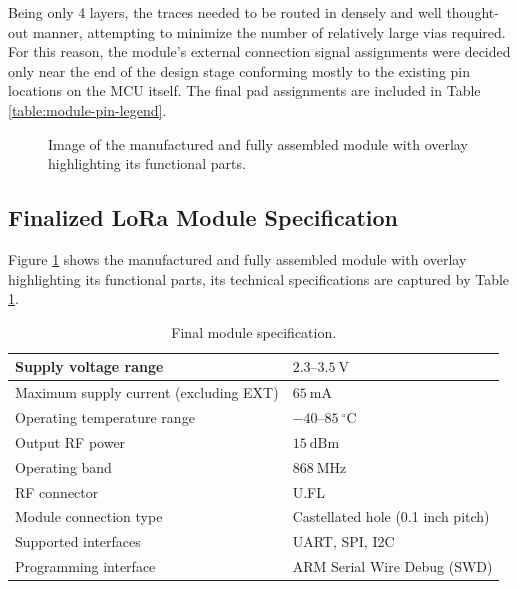 Being only 4 layers, the traces needed to be routed in densely and well thought-out manner, attempting to minimize the number of relatively large vias required. For this reason, the module's external connection signal assignments were decided only near the end of the design stage conforming mostly to the existing pin locations on the MCU itself. The final pad assignments are included in Table \ref{table:module-pin-legend}.

\begin{figure}
    
    \caption{\label{fig:module-v0.1}Image of the manufactured and fully assembled module with overlay highlighting its functional parts.}
\end{figure}

\subsection{Finalized LoRa Module Specification}
Figure \ref{fig:module-v0.1} shows the manufactured and fully assembled module with overlay highlighting its functional parts, its technical specifications are captured by Table \ref{table:module-specification}.

\begin{table}[p]
\begin{center}
\caption{\label{table:module-specification}Final module specification.}
    \begin{tabular}{|l|l|} \hline
    Supply voltage range                    & $2.3\text{--}3.5~\mathrm{V}$\\ \hline
    Maximum supply current (excluding EXT)  & $65~\mathrm{mA}$\\ \hline
    Operating temperature range             & $-40\text{--}85~\mathrm{^\circ C}$\\ \hline
    Output RF power                         & $15~\mathrm{dBm}$\\ \hline
    Operating band                          & $868~\mathrm{MHz}$\\ \hline
    RF connector                            & U.FL \\ \hline
    Module connection type                  & Castellated hole (0.1 inch pitch) \\ \hline
    Supported interfaces                    & UART, SPI, I2C \\ \hline
    Programming interface                   & ARM Serial Wire Debug (SWD) \\ \hline
    \end{tabular}
\end{center}
\end{table}

